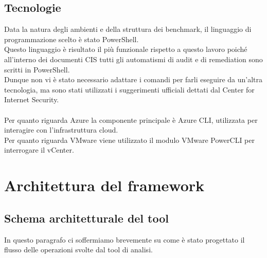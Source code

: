 \documentclass[a4paper,11pt]{report}
\begin{document}
\section{Tecnologie}

Data la natura degli ambienti e della struttura dei benchmark, il linguaggio di programmazione scelto è stato PowerShell. \\
Questo linguaggio è risultato il più funzionale rispetto a questo lavoro poiché all'interno dei documenti CIS tutti gli automatismi di audit e di remediation sono scritti in PowerShell. \\
Dunque non vi è stato necessario adattare i comandi per farli eseguire da un'altra tecnologia, ma sono stati utilizzati i suggerimenti ufficiali dettati dal Center for Internet Security. \\ \\
Per quanto riguarda Azure la componente principale è Azure CLI, utilizzata per interagire con l'infrastruttura cloud.\\
Per quanto riguarda VMware viene utilizzato il modulo VMware PowerCLI per interrogare il vCenter.

\chapter{Architettura del framework}


\section{Schema architetturale del tool}

In questo paragrafo ci soffermiamo brevemente su come è stato progettato il flusso delle operazioni svolte dal tool di analisi. \\
\end{document}
